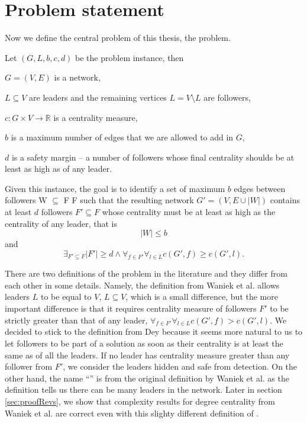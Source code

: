 \chapter{Problem statement}

Now we define the central problem of this thesis, the \HL problem.

\begin{definition}\label{HL}
    Let $(G, L, b, c, d)$ be the problem instance, then
    \begin{description}
        \item $G = (V, E)$ is a network,
        \item $L \subseteq V$ are leaders and the remaining vertices $L = V \setminus L$ are followers,
        \item $c : G \times V \rightarrow \mathbb{R}$ is a centrality measure,
        \item $b$ is a maximum number of edges that we are allowed to add in $G$,
        \item $d$ is a safety margin -- a number of followers whose final centrality shoulds be at least as high as of any leader.
    \end{description}
    Given this instance, the goal is to identify a set of maximum $b$ edges between followers W $\subseteq$ F {\texttimes} F
    such that the resulting network $G' = (V, E \cup |W|)$ contains at least $d$ followers $F' \subseteq F$
    whose centrality must be at least as high as the centrality of any leader, that is
    $$|W| \leq b$$
    and
    $$\exists_{F' \subseteq F} |F'| \geq d \wedge \forall_{f \in F'} \forall_{l \in L} c(G', f) \geq c(G', l).$$
\end{definition}

There are two definitions of the \HL problem in the literature and they differ from each other in some details.
Namely, the definition from Waniek et al. \cite{Waniek2017} allows leaders $L$ to be equal to $V$, $L \subseteq V$,
which is a small difference, but the more important difference is that it requires centrality measure of followers $F'$ to be strictly greater
than that of any leader, $\forall_{f \in F'} \forall_{l \in L} c(G', f) > c(G', l)$.
We decided to stick to the definition from Dey \cite{Dey2019} because it seems more natural to us to let followers to be part of a solution
as soon as their centrality is at least the same as of all the leaders. If no leader has centrality measure greater than any follower from $F'$,
we consider the leaders hidden and safe from detection.
On the other hand, the name ``\HL'' is from the original definition by Waniek et al. as the definition tells us there can be many leaders in the network.
Later in section \ref{sec:proofRevs}, we show that complexity results for degree centrality from Waniek et al.
are correct even with this slighty different definition of \HLshort.
